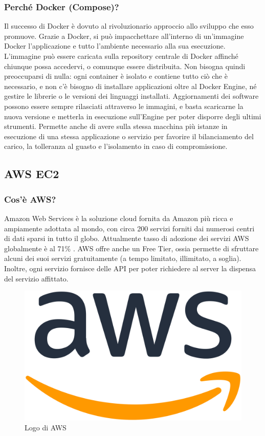             \subsubsection{Perché Docker (Compose)?}
                Il successo di Docker è dovuto al rivoluzionario approccio allo sviluppo che esso promuove. Grazie a Docker, si può impacchettare all'interno di un'immagine Docker l'applicazione e tutto l'ambiente necessario alla sua esecuzione. L'immagine può essere caricata sulla repository centrale di Docker affinché chiunque possa accedervi, o comunque essere distribuita. Non bisogna quindi preoccuparsi di nulla: ogni container è isolato e contiene tutto ciò che è necessario, e non c'è bisogno di installare applicazioni oltre al Docker Engine, né gestire le librerie o le versioni dei linguaggi installati. Aggiornamenti dei software possono essere sempre rilasciati attraverso le immagini, e basta scaricarne la nuova versione e metterla in esecuzione sull'Engine per poter disporre degli ultimi strumenti. Permette anche di avere sulla stessa macchina più istanze in esecuzione di una stessa applicazione o servizio per favorire il bilanciamento del carico, la tolleranza al guasto e l'isolamento in caso di compromissione.
                
        \subsection{AWS EC2}
            \subsubsection{Cos'è AWS? \cite{AWS1}}
                Amazon Web Services è la soluzione cloud fornita da Amazon più ricca e ampiamente adottata al mondo, con circa 200 servizi forniti dai numerosi centri di dati sparsi in tutto il globo. Attualmente tasso di adozione dei servizi AWS globalmente è al 71\% \cite{CNN1}. AWS offre anche un Free Tier, ossia permette di sfruttare alcuni dei suoi servizi gratuitamente (a tempo limitato, illimitato, a soglia). Inoltre, ogni servizio fornisce delle API per poter richiedere al server la dispensa del servizio affittato.
            \begin{figure}[htbp!]
                \centering
                \includegraphics[width=0.2\linewidth]{Immagini/System Design/AWS.png}
                \caption{Logo di AWS}
            \end{figure}
